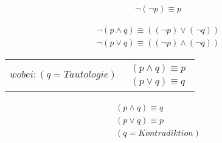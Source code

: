 \vspace{-.7cm}

\begin{framed} [Doppelnegation] 
  \begin{equation*}
    \begin{aligned}
      \neg(\neg p) \equiv p 
    \end{aligned}
  \end{equation*}
\end{framed}

\vspace{-.7cm}

\begin{framed}  
  \begin{equation*}
    \begin{aligned}
      \neg(p \wedge q) \equiv ((\neg p)\vee (\neg q)) \\ 
      \neg(p \vee q) \equiv ((\neg p)\wedge (\neg q)) 
    \end{aligned}
  \end{equation*}	
\end{framed}

\vspace{-.7cm}

\begin{framed} [Tautologieregeln] 
  \begin{center}
    \vspace{-.3cm}
    \begin{tabular} {c c}
      \parbox{.5\textwidth}{\begin{equation*}
        wobei: (q = Tautologie)
      \end{equation*}}
      &
      \parbox{3cm}{\begin{equation*}
        \begin{aligned}
          (p \wedge q) \equiv p \\ 
          (p \vee q) \equiv q
        \end{aligned}
      \end{equation*}}
    \end{tabular}
    \vspace{-.3cm}
  \end{center}
\end{framed}

\vspace{-.7cm}

\begin{framed} [Kontradiktionsregeln] 
  \begin{equation*}
    \begin{aligned}
      (p \wedge q) \equiv q \\ 
      (p \vee q) \equiv p \\
      (q = Kontradiktion) 
    \end{aligned}
  \end{equation*}
\end{framed}

